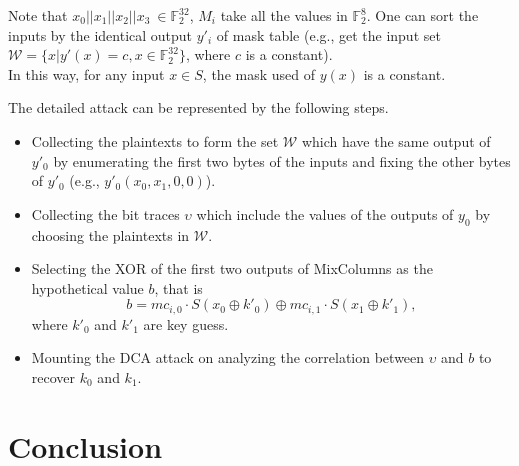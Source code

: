 \documentclass{beamer}
\begin{document}
\frame
{
	Note that $x_0||x_1||x_2||x_3\ \in \mathbb{F}_{2}^{32}$, $M_i$ take all the values in $\mathbb{F}_{2}^{8}$. One can sort the inputs by the identical output $y'_i$ of mask table (e.g., get the input set $\mathcal{W}=\{x|y'(x)=c,x\in\mathbb{F}_{2}^{32}\}$, where $c$ is a constant).
	\\[2ex]
	In this way, for any input $x\in S$, the mask used of $y(x)$ is a constant.
	
}

\frame
{
	The detailed attack can be represented by the following steps.
	\begin{itemize}	
		\item Collecting the plaintexts to form the set $\mathcal{W}$ which have the same output of $y'_0$ by enumerating the first two bytes of the inputs and fixing the other bytes of $y'_0$ (e.g., $y'_0(x_0,x_1,0,0)$).
		\item Collecting the bit traces $\upsilon$ which include the values of the outputs of $y_0$ by choosing the plaintexts in $\mathcal{W}$.
	\end{itemize}
}

\frame
{
	\begin{itemize}
		\item Selecting the XOR of the first two outputs of MixColumns as the hypothetical value $b$, that is
		\begin{displaymath}
		b=mc_{i,0}\cdot S(x_0\oplus k'_0)\oplus mc_{i,1}\cdot S(x_1\oplus k'_1),
		\end{displaymath}
		where $k'_0$ and $k'_1$ are key guess.
		\item Mounting the DCA attack on analyzing the correlation between $\upsilon$ and $b$ to recover $k_0$ and $k_1$.
	\end{itemize}
}

\section{Conclusion}

\end{document}
